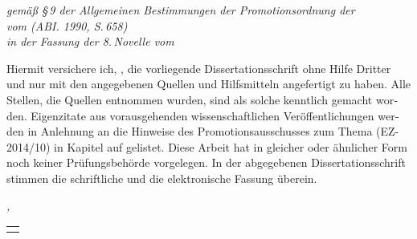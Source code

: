 
\begin{otherlanguage}{ngerman}



\begin{flushright}
    \emph{\small gemäß §\,9 der Allgemeinen Bestimmungen der Promotionsordnung der \\
    \myUni{} vom  (ABI. 1990, S.\,658) \\
    in der Fassung der 8.\,Novelle vom }
\end{flushright}
Hiermit versichere ich, \myName{}, die vorliegende Dissertationsschrift ohne Hilfe Dritter und nur mit den angegebenen Quellen und Hilfsmitteln angefertigt zu haben. Alle Stellen, die Quellen entnommen wurden, sind als solche kenntlich gemacht worden. Eigenzitate aus vorausgehenden wissenschaftlichen Veröffentlichungen werden in Anlehnung an die Hinweise des Promotionsausschusses \myFacultyDE{} zum Thema  (EZ-2014/10) in Kapitel  auf  gelistet. Diese Arbeit hat in gleicher oder ähnlicher Form noch keiner Prüfungsbehörde vorgelegen. In der abgegebenen Dissertationsschrift stimmen die schriftliche und die elektronische Fassung überein.

\bigskip

\noindent\textit{\myLocation{}, \myTime{}}

\begin{flushright}
    \begin{tabular}{m{5cm}}
        \\ \hline
        \centering\myName{} \\
    \end{tabular}
\end{flushright}

\end{otherlanguage}

